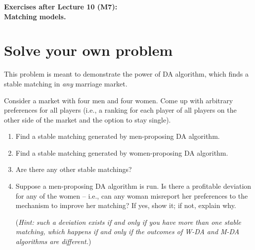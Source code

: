 \documentclass[a4paper]{article}
\newif\ifsolutions
\begin{document}
\begin{center}
		\LARGE\textbf{Exercises after Lecture 10 (M7):\\ Matching models.}
\end{center}



\section{Solve your own problem}
	
	This problem is meant to demonstrate the power of DA algorithm, which finds a stable matching in \emph{any} marriage market. 
	
	Consider a market with four men and four women. Come up with arbitrary preferences for all players (i.e., a ranking for each player of all players on the other side of the market and the option to stay single).
	\begin{enumerate}
		\item Find a stable matching generated by men-proposing DA algorithm.
		\item Find a stable matching generated by women-proposing DA algorithm.
		\item Are there any other stable matchings?
		\item Suppose a men-proposing DA algorithm is run. Is there a profitable deviation for any of the women -- i.e., can any woman misreport her preferences to the mechanism to improve her matching? If yes, show it; if not, explain why.
		
		(\emph{Hint: such a deviation exists if and only if you have more than one stable matching, which happens if and only if the outcomes of W-DA and M-DA algorithms are different.})
	\end{enumerate}
	
	
\ifsolutions
\end{document}
